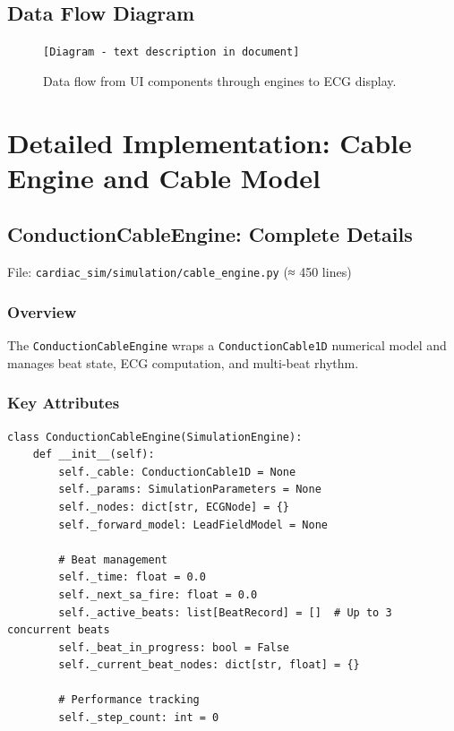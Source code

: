 \documentclass[12pt,a4paper,oneside]{book}
\begin{document}
\section{Data Flow Diagram}

\begin{figure}[H]
    \centering
    
    \begin{center}
    \texttt{[Diagram - text description in document]}
    \end{center}
    
    \caption{Data flow from UI components through engines to ECG display.}
    \label{fig:dataflow}
\end{figure}

\chapter{Detailed Implementation: Cable Engine and Cable Model}

\section{ConductionCableEngine: Complete Details}

File: \texttt{cardiac\_sim/simulation/cable\_engine.py} (≈ 450 lines)

\subsection{Overview}

The \texttt{ConductionCableEngine} wraps a \texttt{ConductionCable1D} numerical model and manages beat state, ECG computation, and multi-beat rhythm.

\subsection{Key Attributes}

\begin{Verbatim}[formatcom=\color{black}]
class ConductionCableEngine(SimulationEngine):
    def __init__(self):
        self._cable: ConductionCable1D = None
        self._params: SimulationParameters = None
        self._nodes: dict[str, ECGNode] = {}
        self._forward_model: LeadFieldModel = None
        
        # Beat management
        self._time: float = 0.0
        self._next_sa_fire: float = 0.0
        self._active_beats: list[BeatRecord] = []  # Up to 3 concurrent beats
        self._beat_in_progress: bool = False
        self._current_beat_nodes: dict[str, float] = {}
        
        # Performance tracking
        self._step_count: int = 0
\end{Verbatim}
\end{document}
